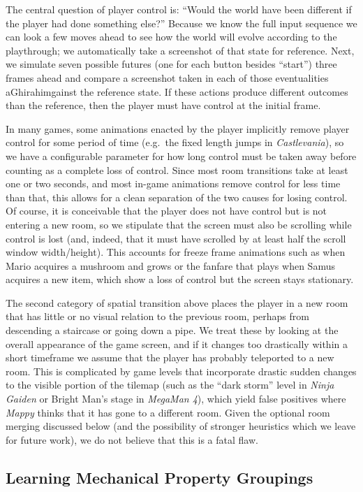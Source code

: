 \documentclass[12pt]{report}
\begin{document}
The central question of player control is: ``Would the world have been different if the player had done something else?''
Because we know the full input sequence we can look a few moves ahead to see how the world will evolve according to the playthrough; we automatically take a screenshot of that state for reference.
Next, we simulate seven possible futures (one for each button besides ``start'') three frames ahead and compare a screenshot taken in each of those eventualities aGhirahimgainst the reference state.
If these actions produce different outcomes than the reference, then the player must have control at the initial frame.

In many games, some animations enacted by the player implicitly remove player control for some period of time (e.g.\ the fixed length jumps in \emph{Castlevania}), so we have a configurable parameter for how long control must be taken away before counting as a complete loss of control.
Since most room transitions take at least one or two seconds, and most in-game animations remove control for less time than that, this allows for a clean separation of the two causes for losing control.
Of course, it is conceivable that the player does not have control but is not entering a new room, so we stipulate that the screen must also be scrolling while control is lost (and, indeed, that it must have scrolled by at least half the scroll window width/height).
This accounts for freeze frame animations such as when Mario acquires a mushroom and grows or the fanfare that plays when Samus acquires a new item, which show a loss of control but the screen stays stationary.

The second category of spatial transition above places the player in a new room that has little or no visual relation to the previous room, perhaps from descending a staircase or going down a pipe.
We treat these by looking at the overall appearance of the game screen, and if it changes too drastically within a short timeframe we assume that the player has probably teleported to a new room.
This is complicated by game levels that incorporate drastic sudden changes to the visible portion of the tilemap (such as the ``dark storm'' level in \emph{Ninja Gaiden} or Bright Man's stage in \emph{MegaMan 4}), which yield false positives where \emph{Mappy} thinks that it has gone to a different room.
Given the optional room merging discussed below (and the possibility of stronger heuristics which we leave for future work), we do not believe that this is a fatal flaw.

\subsection*{Learning Mechanical Property Groupings}
\end{document}
